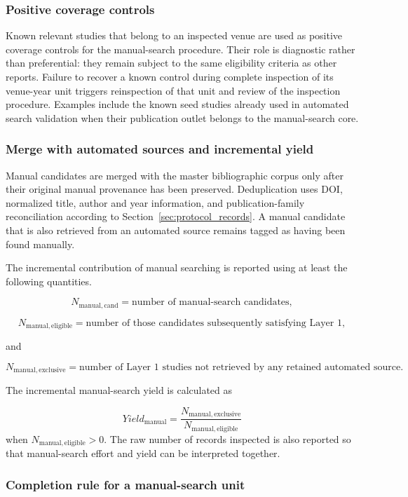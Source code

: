 \subsubsection{Positive coverage controls}

Known relevant studies that belong to an inspected venue are used as positive coverage controls
for the manual-search procedure. Their role is diagnostic rather than preferential: they remain
subject to the same eligibility criteria as other reports. Failure to recover a known control
during complete inspection of its venue-year unit triggers reinspection of that unit and review
of the inspection procedure. Examples include the known seed studies already used in automated
search validation when their publication outlet belongs to the manual-search core.

\subsubsection{Merge with automated sources and incremental yield}

Manual candidates are merged with the master bibliographic corpus only after their original
manual provenance has been preserved. Deduplication uses DOI, normalized title, author and year
information, and publication-family reconciliation according to Section~\ref{sec:protocol_records}.
A manual candidate that is also retrieved from an automated source remains tagged as having been
found manually.

The incremental contribution of manual searching is reported using at least the following
quantities.

\[
N_{\mathrm{manual,cand}}
=
\text{number of manual-search candidates},
\]

\[
N_{\mathrm{manual,eligible}}
=
\text{number of those candidates subsequently satisfying Layer~1},
\]

and

\[
N_{\mathrm{manual,exclusive}}
=
\text{number of Layer~1 studies not retrieved by any retained automated source}.
\]

The incremental manual-search yield is calculated as

\[
Yield_{\mathrm{manual}}
=
\frac{N_{\mathrm{manual,exclusive}}}
{N_{\mathrm{manual,eligible}}}
\]
when \(N_{\mathrm{manual,eligible}}>0\). The raw number of records inspected is also reported so
that manual-search effort and yield can be interpreted together.

\subsubsection{Completion rule for a manual-search unit}

